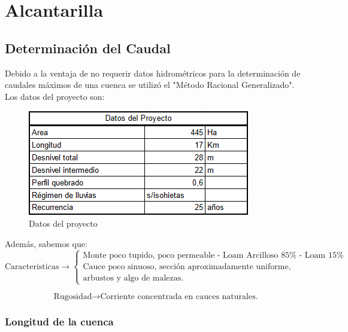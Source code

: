 \documentclass[../main.tex]{subfiles}
\begin{document}
\section{Alcantarilla}

\subsection{Determinación del Caudal}

Debido a la ventaja de no requerir datos hidrométricos para la determinación de caudales máximos de una cuenca se utilizó  el "Método Racional Generalizado". Los datos del proyecto son:

\begin{figure}[h]
    \centering
    \includegraphics{images/google_sheets/Screenshot_6.png}
    \caption{Datos del proyecto}
    \label{fig:datos_proyecto}
\end{figure}

Además, sabemos que:
\begin{equation*}
    \text{Caracteristicas} \longrightarrow
        \begin{cases} 
            \text{Monte poco tupido, poco permeable - Loam Arcilloso $85\%$ - Loam $15\%$} \\
            \text{Cauce poco sinuoso, sección aproximadamente uniforme,} \\ \text{arbustos y algo de malezas.}
        \end{cases}
\end{equation*}

\begin{equation*}
    \text{Rugosidad}  \longrightarrow \text{Corriente concentrada en cauces naturales.}
\end{equation*}

\subsubsection{Longitud de la cuenca}
\end{document}
